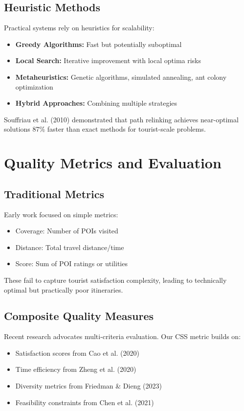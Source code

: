 \subsection{Heuristic Methods}

Practical systems rely on heuristics for scalability:
\begin{itemize}
    \item \textbf{Greedy Algorithms:} Fast but potentially suboptimal
    \item \textbf{Local Search:} Iterative improvement with local optima risks
    \item \textbf{Metaheuristics:} Genetic algorithms, simulated annealing, ant colony optimization
    \item \textbf{Hybrid Approaches:} Combining multiple strategies
\end{itemize}

Souffriau et al. (2010) demonstrated that path relinking achieves near-optimal solutions 87\% faster than exact methods for tourist-scale problems.

\section{Quality Metrics and Evaluation}

\subsection{Traditional Metrics}

Early work focused on simple metrics:
\begin{itemize}
    \item Coverage: Number of POIs visited
    \item Distance: Total travel distance/time
    \item Score: Sum of POI ratings or utilities
\end{itemize}

These fail to capture tourist satisfaction complexity, leading to technically optimal but practically poor itineraries.

\subsection{Composite Quality Measures}

Recent research advocates multi-criteria evaluation. Our CSS metric builds on:
\begin{itemize}
    \item Satisfaction scores from Cao et al. (2020)
    \item Time efficiency from Zheng et al. (2020)
    \item Diversity metrics from Friedman \& Dieng (2023)
    \item Feasibility constraints from Chen et al. (2021)
\end{itemize}

